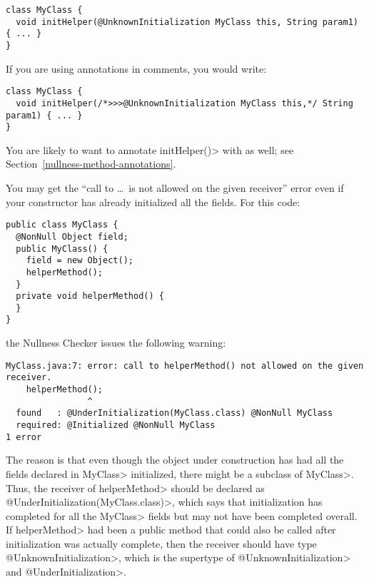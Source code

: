 \begin{Verbatim}
class MyClass {
  void initHelper(@UnknownInitialization MyClass this, String param1) { ... }
}
\end{Verbatim}

\noindent
If you are using annotations in comments, you would write:

\begin{Verbatim}
class MyClass {
  void initHelper(/*>>>@UnknownInitialization MyClass this,*/ String param1) { ... }
}
\end{Verbatim}

\noindent
You are likely to want to annotate \<initHelper()> with
 as well; see
Section~\ref{nullness-method-annotations}.


You may get the ``call to \ldots\ is not allowed on the given receiver''
error even if your constructor has already initialized all the fields.  
For this code:

\begin{Verbatim}
public class MyClass {
  @NonNull Object field;
  public MyClass() {
    field = new Object();
    helperMethod();
  }
  private void helperMethod() {
  }
}
\end{Verbatim}

\noindent
the Nullness Checker issues the following warning:

\begin{Verbatim}
MyClass.java:7: error: call to helperMethod() not allowed on the given receiver.
    helperMethod();
                ^
  found   : @UnderInitialization(MyClass.class) @NonNull MyClass
  required: @Initialized @NonNull MyClass
1 error
\end{Verbatim}

\begin{sloppypar}
The reason is that even though the object under construction has had all
the fields declared in \<MyClass> initialized, there might be a subclass of
\<MyClass>.  Thus, the receiver of \<helperMethod> should be declared as 
\<@UnderInitialization(MyClass.class)>, which says that initialization has
completed for all the \<MyClass> fields but may not have been completed
overall.  If \<helperMethod> had been a public method that could also be called after
initialization was actually complete, then the receiver should have type
\<@UnknownInitialization>, which is the supertype of
\<@UnknownInitialization> and \<@UnderInitialization>.
\end{sloppypar}


